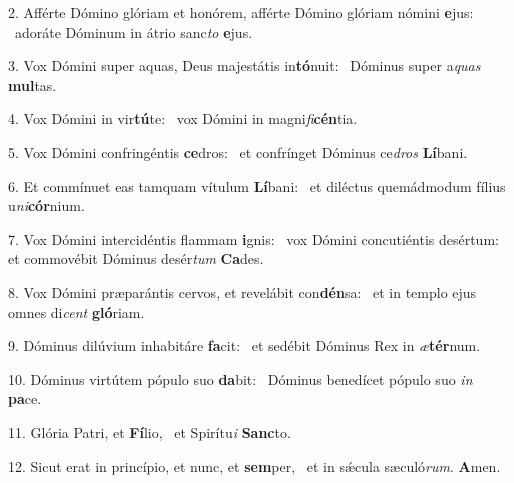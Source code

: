 2. Afférte Dómino glóriam et honórem, afférte Dómino glóriam nómini \textbf{e}jus: \ast\  adoráte Dóminum in átrio sanc\textit{to} \textbf{e}jus.\

3. Vox Dómini super aquas, Deus majestátis in\textbf{tó}nuit: \ast\  Dóminus super a\textit{quas} \textbf{mul}tas.\

4. Vox Dómini in vir\textbf{tú}te: \ast\  vox Dómini in magni\textit{fi}\textbf{cén}tia.\

5. Vox Dómini confringéntis \textbf{ce}dros: \ast\  et confrínget Dóminus ce\textit{dros} \textbf{Lí}bani.\

6. Et commínuet eas tamquam vítulum \textbf{Lí}bani: \ast\  et diléctus quemádmodum fílius u\textit{ni}\textbf{cór}nium.\

7. Vox Dómini intercidéntis flammam \textbf{i}gnis: \ast\  vox Dómini concutiéntis desértum: et commovébit Dóminus desér\textit{tum} \textbf{Ca}des.\

8. Vox Dómini præparántis cervos, et revelábit con\textbf{dén}sa: \ast\  et in templo ejus omnes di\textit{cent} \textbf{gló}riam.\

9. Dóminus dilúvium inhabitáre \textbf{fa}cit: \ast\  et sedébit Dóminus Rex in \textit{æ}\textbf{tér}num.\

10. Dóminus virtútem pópulo suo \textbf{da}bit: \ast\  Dóminus benedícet pópulo suo \textit{in} \textbf{pa}ce.\

11. Glória Patri, et \textbf{Fí}lio, \ast\  et Spirítu\textit{i} \textbf{Sanc}to.\

12. Sicut erat in princípio, et nunc, et \textbf{sem}per, \ast\  et in sǽcula sæculó\textit{rum}. \textbf{A}men.\

